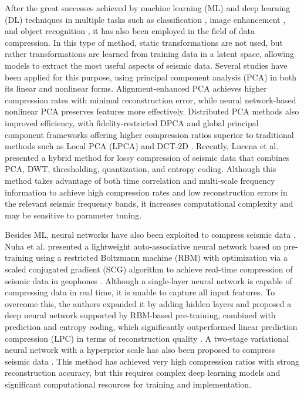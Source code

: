 \documentclass[fleqn,10pt]{wlscirep}
\begin{document}
After the great successes achieved by machine learning (ML) and deep learning (DL) techniques in multiple tasks such as classification \cite{mehmood2024utilizing,hamida20183}, image enhancement \cite{khan2024lit,yao2024spatial}, and object recognition \cite{eman2023innovative,zhang2024few}, it has also been employed in the field of data compression. In this type of method, static transformations are not used, but rather transformations are learned from training data in a latent space, allowing models to extract the most useful aspects of seismic data. Several studies \cite{nuha2017seismic,brankovic2021machine,reddy2012nonlinear,zheng2019fidelity,liu2018distributed} have been applied for this purpose, using principal component analysis (PCA) in both its linear \cite{nuha2017seismic} and nonlinear \cite{reddy2012nonlinear} forms. Alignment-enhanced PCA achieves higher compression rates with minimal reconstruction error, while neural network-based nonlinear PCA preserves features more effectively. Distributed PCA methods also improved efficiency, with fidelity-restricted DPCA \cite{zheng2019fidelity} and global principal component frameworks offering higher compression ratios superior to traditional methods such as Local PCA (LPCA) and DCT-2D \cite{liu2018distributed}. Recently, Lucena et al. \cite{lucena2025multi} presented a hybrid method for lossy compression of seismic data that combines PCA, DWT, thresholding, quantization, and entropy coding. Although this method takes advantage of both time correlation and multi-scale frequency information to achieve high compression rates and low reconstruction errors in the relevant seismic frequency bands, it increases computational complexity and may be sensitive to parameter tuning.

Besides ML, neural networks have also been exploited to compress seismic data \cite{nuha2018seismic}. Nuha et al. presented a lightweight auto-associative neural network based on pre-training using a restricted Boltzmann machine (RBM) \cite{hinton2006reducing} with optimization via a scaled conjugated gradient (SCG) \cite{moller1993scaled} algorithm to achieve real-time compression of seismic data in geophones \cite{nuha2018seismic}. Although a single-layer neural network is capable of compressing data in real time, it is unable to capture all input features. To overcome this, the authors expanded it by adding hidden layers and proposed a deep neural network supported by RBM-based pre-training, combined with prediction and entropy coding, which significantly outperformed linear prediction compression (LPC) in terms of reconstruction quality \cite{nuha2019seismic2}. A two-stage variational neural network with a hyperprior scale has also been proposed to compress seismic data \cite{wang2024deep}. This method has achieved very high compression ratios with strong reconstruction accuracy, but this requires complex deep learning models and significant computational resources for training and implementation.
\end{document}
